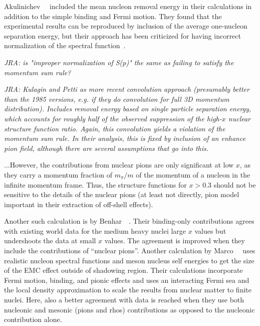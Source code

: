 Akulinichev~\etal~\cite{Akulinichev:1985ij, Akulinichev:1985xq} included the
mean nucleon removal energy in their calculations in addition to the simple
binding and Fermi motion. They found that the experimental results can be
reproduced by inclusion of the average one-nucleon separation energy, but
their approach has been criticized for having incorrect normalization of
the spectral function~\cite{Frankfurt:1985ui}.

\textit{JRA: is "improper normalization of S(p)" the same as
failing to satisfy the momentum sum rule?}

\textit{JRA: Kulagin and Petti as more recent convolution approach
(presumably better than the 1985 versions, e.g. if they do convolution for
full 3D momentum distribution).  Includes removal energy based on single
particle separation energy, which accounts for roughly half of the observed
suppression of the high-$x$ nuclear structure function ratio.  Again, this
convolution yields a violation of the momentum sum rule.  In their analysis,
this is fixed by inclusion of an enhance pion field, although there are
several assumptions that go into this.}

...However, the contributions from nuclear pions are only significant at
low $x$, as they carry a momentum fraction of $m_{\pi}/m$ of the momentum of a
nucleon in the infinite momentum frame.  Thus, the structure functions
for $x>0.3$ should not be sensitive to the details of the nuclear pions (at
least not directly, pion model important in their extraction of off-shell
effects).

Another such calculation is by Benhar~\etal~\cite{benhar_emccalcnucmatt}.
Their binding-only contributions agrees with existing world data for the
medium heavy nuclei large $x$ values but undershoots the data at small $x$
values. The agreement is improved when they include the contributions of
``nuclear pions''. Another calculation by Marco~\etal~\cite{Marco_dis:1995}
uses realistic nucleon spectral functions and meson nucleus self energies to
get the size of the EMC effect outside of shadowing region. Their
calculations incorporate Fermi motion, binding, and pionic effects and uses an
interacting Fermi sea and the local density approximation to scale the results
from nuclear matter to finite nuclei. Here, also a better agreement with data
is reached when they use both nucleonic and mesonic (pions and rhos)
contributions as opposed to the nucleonic contribution alone.


